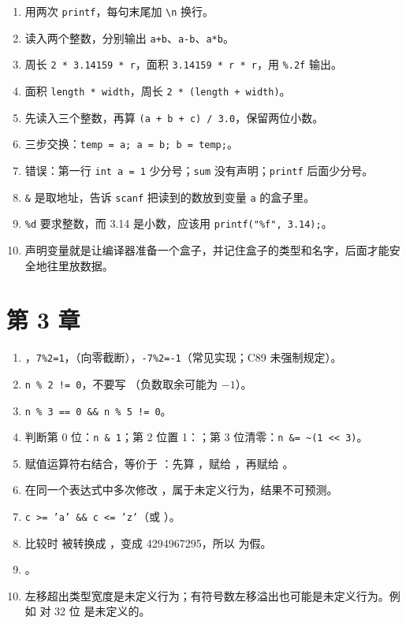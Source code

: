 \begin{enumerate}
  \item 用两次 \texttt{printf}，每句末尾加 \texttt{\textbackslash n} 换行。
  \item 读入两个整数，分别输出 \texttt{a+b}、\texttt{a-b}、\texttt{a*b}。
  \item 周长 \texttt{2 * 3.14159 * r}，面积 \texttt{3.14159 * r * r}，用 \texttt{\%.2f} 输出。
  \item 面积 \texttt{length * width}，周长 \texttt{2 * (length + width)}。
  \item 先读入三个整数，再算 \texttt{(a + b + c) / 3.0}，保留两位小数。
  \item 三步交换：\texttt{temp = a; a = b; b = temp;}。
  \item 错误：第一行 \texttt{int a = 1} 少分号；\texttt{sum} 没有声明；\texttt{printf} 后面少分号。
  \item \texttt{\&} 是取地址，告诉 \texttt{scanf} 把读到的数放到变量 \texttt{a} 的盒子里。
  \item \texttt{\%d} 要求整数，而 3.14 是小数，应该用 \texttt{printf("\%f", 3.14);}。
  \item 声明变量就是让编译器准备一个盒子，并记住盒子的类型和名字，后面才能安全地往里放数据。
\end{enumerate}

\section{第 3 章}

\begin{enumerate}
  \item {}，\texttt{7\%2=1}，（向零截断），\texttt{-7\%2=-1}（常见实现；C89 未强制规定）。
  \item \texttt{n \% 2 != 0}，不要写 （负数取余可能为 $-1$）。
  \item \texttt{n \% 3 == 0 \&\& n \% 5 != 0}。
  \item 判断第 0 位：\texttt{n \& 1}；第 2 位置 1：；第 3 位清零：\texttt{n \&= \textasciitilde{}(1 << 3)}。
  \item 赋值运算符右结合，等价于 ：先算 ，赋给 ，再赋给 。
  \item {} 在同一个表达式中多次修改 ，属于未定义行为，结果不可预测。
  \item \texttt{c >= 'a' \&\& c <= 'z'}（或 ）。
  \item 比较时  被转换成 ，变成 4294967295，所以  为假。
  \item {}。
  \item 左移超出类型宽度是未定义行为；有符号数左移溢出也可能是未定义行为。例如  对 32 位  是未定义的。
\end{enumerate}

